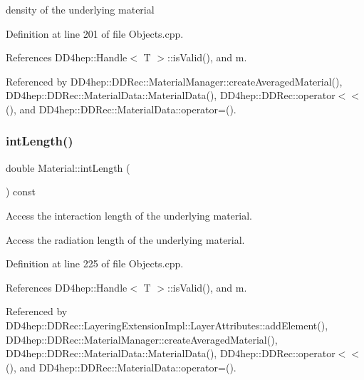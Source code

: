 density of the underlying material 



Definition at line 201 of file Objects.\+cpp.



References D\+D4hep\+::\+Handle$<$ T $>$\+::is\+Valid(), and m.



Referenced by D\+D4hep\+::\+D\+D\+Rec\+::\+Material\+Manager\+::create\+Averaged\+Material(), D\+D4hep\+::\+D\+D\+Rec\+::\+Material\+Data\+::\+Material\+Data(), D\+D4hep\+::\+D\+D\+Rec\+::operator$<$$<$(), and D\+D4hep\+::\+D\+D\+Rec\+::\+Material\+Data\+::operator=().

\hypertarget{class_d_d4hep_1_1_geometry_1_1_material_a706e3df0aaafbd74da01f9132525f85b}{}\label{class_d_d4hep_1_1_geometry_1_1_material_a706e3df0aaafbd74da01f9132525f85b} 
\subsubsection{\texorpdfstring{int\+Length()}{intLength()}}
{\footnotesize\ttfamily double Material\+::int\+Length (\begin{DoxyParamCaption}{ }\end{DoxyParamCaption}) const}



Access the interaction length of the underlying material. 

Access the radiation length of the underlying material. 

Definition at line 225 of file Objects.\+cpp.



References D\+D4hep\+::\+Handle$<$ T $>$\+::is\+Valid(), and m.



Referenced by D\+D4hep\+::\+D\+D\+Rec\+::\+Layering\+Extension\+Impl\+::\+Layer\+Attributes\+::add\+Element(), D\+D4hep\+::\+D\+D\+Rec\+::\+Material\+Manager\+::create\+Averaged\+Material(), D\+D4hep\+::\+D\+D\+Rec\+::\+Material\+Data\+::\+Material\+Data(), D\+D4hep\+::\+D\+D\+Rec\+::operator$<$$<$(), and D\+D4hep\+::\+D\+D\+Rec\+::\+Material\+Data\+::operator=().

\hypertarget{class_d_d4hep_1_1_geometry_1_1_material_a6aba801762277de94cb91603a87bb7ff}{}\label{class_d_d4hep_1_1_geometry_1_1_material_a6aba801762277de94cb91603a87bb7ff} 
